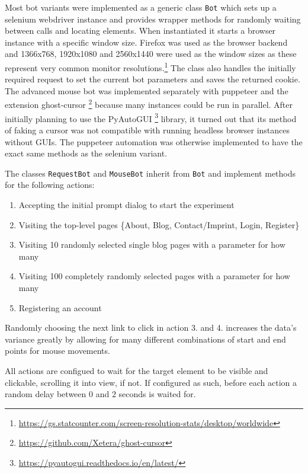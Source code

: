 \documentclass[
    fontsize=12pt,
    headings=small,
    parskip=half,           %
    bibliography=totoc,
    numbers=noenddot,       %
    open=any,               %
    final,                   %
    table
]{scrreprt}
\begin{document}
Most bot variants were implemented as a generic class \lstinline{Bot} which sets up a selenium webdriver instance and provides wrapper methods for randomly waiting between calls and locating elements. When instantiated it starts a  browser instance with a specific window size. Firefox was used as the browser backend and 1366x768, 1920x1080 and 2560x1440 were used as the window sizes as these represent very common monitor resolutions.\footnote{\url{https://gs.statcounter.com/screen-resolution-stats/desktop/worldwide}} The class also handles the initially required request to set the current bot parameters and saves the returned cookie. The advanced mouse bot was implemented separately with puppeteer and the extension ghost-cursor \footnote{\url{https://github.com/Xetera/ghost-cursor}} because many instances could be run in parallel. After initially planning to use the PyAutoGUI \footnote{\url{https://pyautogui.readthedocs.io/en/latest/}} library, it turned out that its method of faking a cursor was not compatible with running headless browser instances without GUIs. The puppeteer automation was otherwise implemented to have the exact same methods as the selenium variant.

The classes \lstinline{RequestBot} and \lstinline{MouseBot} inherit from \lstinline{Bot} and implement methods for the following actions:

\begin{enumerate}
    \item Accepting the initial prompt dialog to start the experiment
    \item Visiting the top-level pages \{About, Blog, Contact/Imprint, Login, Register\}
    \item Visiting 10 randomly selected single blog pages with a parameter for how many
    \item Visiting 100 completely randomly selected pages with a parameter for how many
    \item Registering an account
\end{enumerate}

Randomly choosing the next link to click in action 3. and 4. increases the data's variance greatly by allowing for many different combinations of start and end points for mouse movements.

All actions are configued to wait for the target element to be visible and clickable, scrolling it into view, if not. If configured as such, before each action a random delay between $0$ and $2$ seconds is waited for.
\end{document}
